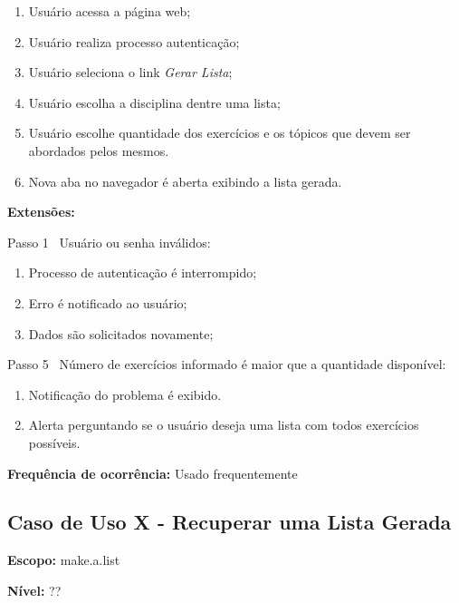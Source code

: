 \documentclass[12pt,oneside,a4paper,article]{abntex2}
\begin{document}
		\begin{enumerate}
			\item Usuário acessa a página web;
			
			\item Usuário realiza processo autenticação;
			
			\item Usuário seleciona o link \textit{Gerar Lista};
			
			\item Usuário escolha a disciplina dentre uma lista;
			
			\item Usuário escolhe quantidade dos exercícios e os tópicos que devem ser abordados pelos mesmos.	
			
			\item Nova aba no navegador é aberta exibindo a lista gerada.
			
		\end{enumerate}
		
		\textbf{Extensões:} 
		
		Passo 1 \textrightarrow \ Usuário ou senha inválidos:
		
		\begin{enumerate}[label=\alph*.]	
			\item Processo de autenticação é interrompido;
			\item Erro é notificado ao usuário;
			\item Dados são solicitados novamente;
		\end{enumerate}
		
		Passo 5 \textrightarrow \ Número de exercícios informado é maior que a quantidade disponível:
		
		\begin{enumerate}[label=\alph*.]	
			\item Notificação do problema é exibido.
			\item Alerta perguntando se o usuário deseja uma lista com todos exercícios possíveis.
		\end{enumerate}
		
		\textbf{Frequência de ocorrência:} Usado frequentemente
	
		\subsection{Caso de Uso X - Recuperar uma Lista Gerada}
		
		\textbf{Escopo:} make.a.list 
		
		\textbf{Nível:} ??
		
\end{document}
